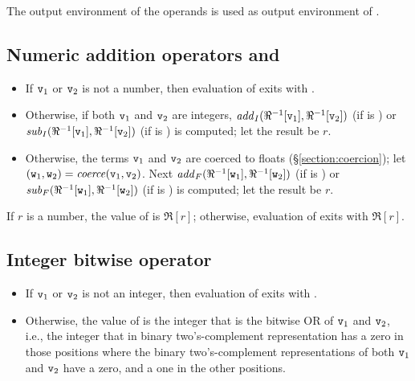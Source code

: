 \ENVIRONMENTS

The output environment of the operands is used as output environment of
.

\subsection{Numeric addition operators \T{+} and \T{-}}

\label{section:additionops}

\begin{itemize}
\item If ${\tt{\sl v}}_1$ or ${\tt{\sl v}}_2$ is not a number, then
evaluation of  exits with \T{\badarith}.
\item Otherwise, if both ${\tt{\sl v}}_1$ and ${\tt{\sl v}}_2$ are integers,
$\mathit{add}_I(\Re^{-1}[{\tt{\sl v}}_1],\Re^{-1}[{\tt{\sl v}}_2])$ (if  is \T{+}) or
$\mathit{sub}_I(\Re^{-1}[{\tt{\sl v}}_1],\Re^{-1}[{\tt{\sl v}}_2])$ (if  is \T{-}) is
computed; let the result be $r$.
\item Otherwise, the terms ${\tt{\sl v}}_1$ and ${\tt{\sl v}}_2$ are coerced to floats
(\S\ref{section:coercion});
let $({\tt{\sl w}}_1,{\tt{\sl w}}_2)=\mathit{coerce}({\tt{\sl v}}_1,{\tt{\sl v}}_2)$.
Next $\mathit{add}_F(\Re^{-1}[{\tt{\sl w}}_1],\Re^{-1}[{\tt{\sl w}}_2])$ (if  is \T{+}) or
$\mathit{sub}_F(\Re^{-1}[{\tt{\sl w}}_1],\Re^{-1}[{\tt{\sl w}}_2])$ (if  is \T{-}) is
computed; let the result be $r$.
\end{itemize}
If $r$ is a number, the value of  is $\Re[r]$;
otherwise, evaluation of 
exits with $\Re[r]$.

\subsection{Integer bitwise operator }

\label{section:bitwiseor}

\begin{itemize}
\item If ${\tt{\sl v}}_1$ or ${\tt{\sl v}}_2$ is not an integer, then
      evaluation of  exits with \T{\badarith}.
\item Otherwise, the value of  is the integer
      that is the bitwise OR of ${\tt{\sl v}}_1$ and ${\tt{\sl v}}_2$,
      i.e., the integer that in binary two's-com\-ple\-ment
      representation has a zero in those positions where the binary
      two's-com\-ple\-ment representations of both
      ${\tt{\sl v}}_1$ and ${\tt{\sl v}}_2$ have a zero, and a
      one in the other positions.
\end{itemize}

